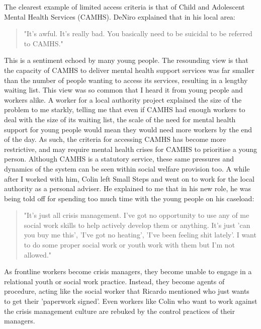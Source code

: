 The clearest example of limited access criteria is that of Child and Adolescent Mental Health Services (CAMHS). DeNiro explained that in his local area:
\begin{quote}
"It's awful. It's really bad. You basically need to be suicidal to be referred to CAMHS."
\end{quote}

This is a sentiment echoed by many young people. The resounding view is that the capacity of CAMHS to deliver mental health support services was far smaller than the number of people wanting to access its services, resulting in a lengthy waiting list. This view was so common that I heard it from young people and workers alike. A worker for a local authority project explained the size of the problem to me starkly, telling me that even if CAMHS had enough workers to deal with the size of its waiting list, the scale of the need for mental health support for young people would mean they would need more workers by the end of the day. As such, the criteria for accessing CAMHS has become more restrictive, and may require mental health crises for CAMHS to prioritise a young person. 
Although CAMHS is a statutory service, these same pressures and dynamics of the system can be seen within social welfare provision too. A while after I worked with him, Colin left Small Steps and went on to work for the local authority as a personal adviser. He explained to me that in his new role, he was being told off for spending too much time with the young people on his caseload:
\begin{quote}
"It's just all crisis management. I've got no opportunity to use any of me social work skills to help actively develop them or anything. It's just 'can you buy me this', 'I've got no heating', 'I've been feeling shit lately'. I want to do some proper social work or youth work with them but I'm not allowed."
\end{quote}
As frontline workers become crisis managers, they become unable to engage in a relational youth or social work practice. Instead, they become agents of procedure, acting like the social worker that Ricardo mentioned who just wants to get their 'paperwork signed'. Even workers like Colin who want to work against the crisis management culture are rebuked by the control practices of their managers. 

